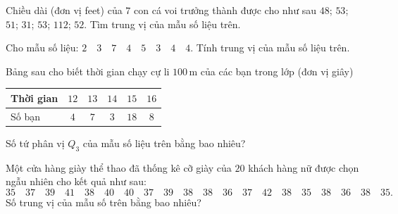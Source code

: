 
\begin{bt}%
	Chiều dài (đơn  vị feet) của $7$ con cá voi trưởng thành được cho như sau $48$; $53$; $51$; $31$; $53$; $112$; $52$. Tìm trung vị của mẫu số liệu trên.
\end{bt}

\begin{bt}%
	Cho  mẫu số liệu: $2\quad 3\quad 7\quad 4\quad 5\quad 3\quad 4\quad 4$. Tính trung vị của mẫu số liệu trên.
\end{bt}

\begin{bt}%
	Bảng sau cho biết thời gian chạy cự li $100$\,m của các bạn trong lớp (đơn  vị giây)
	\begin{center}
		\begin{tabular}{|l|c|c|c|c|c|}
			\hline Thời gian & $12$ &  $13$ & $14$ & $15$ & $16$ \\
			\hline Số  bạn & $4$ & $7$ & $3$ & $18$ & $8$ \\
			\hline 
		\end{tabular}
	\end{center}
	Số tứ phân vị $Q_3$ của mẫu số  liệu trên bằng bao nhiêu?
\end{bt}

\begin{bt}%
	Một cửa hàng giày thể  thao đã thống kê cỡ giày của $20$ khách hàng nữ được chọn ngẫu nhiên cho kết quả như sau:
	 $$
	35\quad 37\quad 39\quad 41\quad 38\quad 40\quad 40\quad  37\quad 39\quad 38\quad 38\quad 36\quad 37\quad 42\quad 38\quad 35\quad 38\quad 36\quad 38\quad 35.
	$$ 
	Số trung vị của mẫu số  trên bằng bao nhiêu?
\end{bt}

